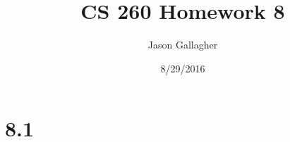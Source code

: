 \documentclass{article}
\begin{document}
                                \title{CS 260 Homework 8}
                                        \date{8/29/2016}
                                                \author{Jason Gallagher}
                                                        \maketitle
                                                                
                                                                        \section{8.1}
                                                                                
\end{document}
